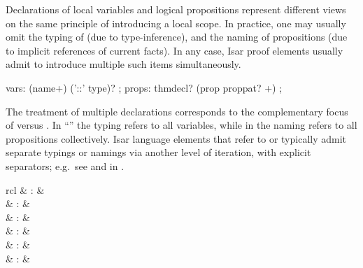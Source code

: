 \begin{isabellebody}
\begin{isamarkuptext}
  \medskip Declarations of local variables  and
  logical propositions  represent different views on
  the same principle of introducing a local scope.  In practice, one
  may usually omit the typing of  (due to
  type-inference), and the naming of propositions (due to implicit
  references of current facts).  In any case, Isar proof elements
  usually admit to introduce multiple such items simultaneously.

  \begin{rail}
    vars: (name+) ('::' type)?
    ;
    props: thmdecl? (prop proppat? +)
    ;
  \end{rail}

  The treatment of multiple declarations corresponds to the
  complementary focus of  versus
  .  In ``''
  the typing refers to all variables, while in  the naming refers to all propositions collectively.
  Isar language elements that refer to  or
   typically admit separate typings or namings via
  another level of iteration, with explicit \mbox{}
  separators; e.g.\ see \mbox{} and \mbox{} in
  .%
\end{isamarkuptext}%
\isamarkuptrue%
%
\isamarkuptrue%
%
\begin{isamarkuptext}%
\begin{matharray}{rcl}
    \mbox{} & : & \isarantiq \\
    \mbox{} & : & \isarantiq \\
    \mbox{} & : & \isarantiq \\
    \mbox{} & : & \isarantiq \\
    \mbox{} & : & \isarantiq \\
    \mbox{} & : & \isarantiq \\

\end{matharray}
\end{isamarkuptext}
\end{isabellebody}
